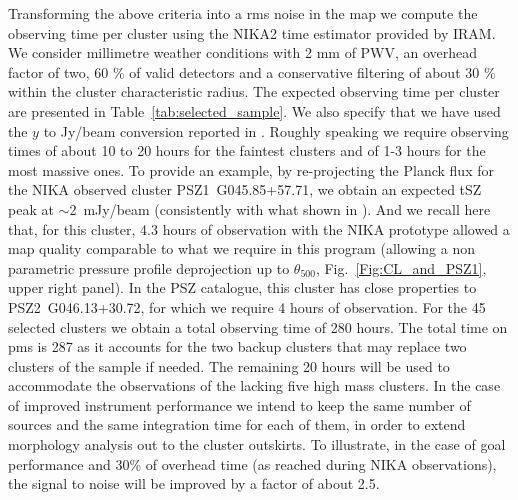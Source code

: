 \documentclass[11pt,a4paper,twoside,graphicx,color]{article}
\begin{document}
Transforming the above criteria into a rms noise in the map we compute the observing time per cluster using the NIKA2 time estimator provided by IRAM. We consider millimetre weather 
conditions with 2 mm of PWV, an overhead factor of two, 60 \% of valid detectors and a conservative filtering of about 30 \% within the cluster characteristic radius. The expected observing time per cluster are presented in Table~\ref{tab:selected_sample}. We also specify that we have used the $y$ to Jy/beam conversion reported in \cite{Adam2015}. Roughly speaking we require observing times of 
about 10 to 20 hours for 
the faintest clusters and of 1-3 hours for the most massive ones. 
To provide an example, by re-projecting the Planck flux for the NIKA observed cluster PSZ1~G045.85+57.71, we obtain an expected tSZ peak at $\sim$2~mJy/beam (consistently with what shown in \cite{Ruppin2016}). And we recall here that, for this cluster, 4.3 hours of observation with the NIKA prototype allowed a map quality comparable to what we require in this program (allowing a non parametric pressure profile deprojection 
up to $\theta _{500}$, Fig.~\ref{Fig:CL_and_PSZ1}, upper right panel). In the PSZ catalogue, this cluster has close properties to PSZ2~G046.13+30.72, for which we require 4 hours of observation. 
For the 45 selected clusters 
we obtain a total observing 
time of 280 hours. The total time on pms is 287 as it accounts for the two backup clusters that may replace two clusters of the sample if
needed.  The remaining 20 hours will be used to accommodate the observations of the lacking five high mass clusters. 
In the case of improved instrument performance we intend to keep the same number 
of sources and the same integration time for each of them, in order to extend morphology analysis out to the cluster outskirts.  
To illustrate, in the case of goal performance and 
30\% of overhead time (as reached during NIKA observations), the signal to noise will be improved by a factor of about 2.5.
\end{document}
